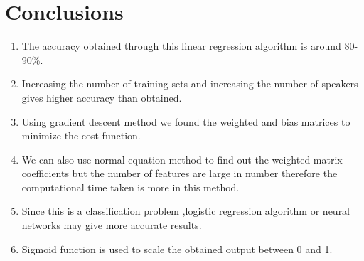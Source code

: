 \documentclass[12pt,letterpaper]{article}
\newcommand{\<}{\langle}
\renewcommand{\>}{\rangle}
\theoremstyle{definition}
\begin{document}
\section{Conclusions}
\begin{enumerate}
	\item The accuracy obtained through this linear regression algorithm is around 80-90\%.
	\item Increasing the number of training sets and increasing the number of speakers gives higher accuracy than obtained.
	\item Using gradient descent method we found the weighted and bias matrices to minimize the cost function.
	\item We can also use normal equation method to find out the weighted matrix coefficients but the number of features are large in number therefore the computational time taken is more in this method.
	\item Since this is a classification problem ,logistic regression algorithm or neural networks may give more accurate results.
	\item Sigmoid function is used to scale the obtained output between 0 and 1.
\end{enumerate}
\end{document}
